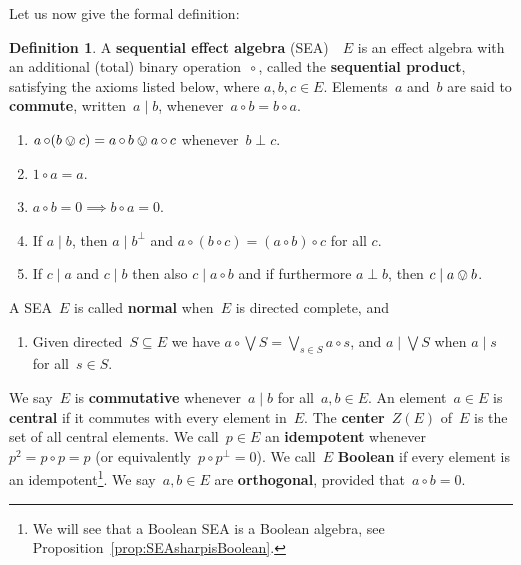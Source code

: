 \documentclass[a4paper, onecolumn, accepted=2020-12-22]{quantumarticle}
\newcommand\Define[1]{\textbf{#1}}
\newcommand{\mult}{\mathop{\circ}}
\newcommand{\commu}{\mathrel{\lvert}}
\newcounter{counter}
\theoremstyle{definition}
\newtheorem{definition}[counter]{Definition}
\begin{document}
Let us now give the formal definition:
\begin{definition}
  \label{defn:sea}
    A \Define{sequential effect algebra}
    (SEA)~\cite{gudder2002sequential}~$E$
    is an
     effect algebra with an additional (total)
    binary operation~$\mult$,
        called the \Define{sequential product},
        satisfying the axioms listed below,
        where $a,b,c\in E$.
        Elements~$a$ and~$b$ are said to \Define{commute},
            written~$a \commu b$,
            whenever~$a \mult b = b \mult a$.
    \begin{enumerate}
        \item[S1.]
            $a\mult (b\ovee c) = a\mult b \ovee a \mult c$
            whenever~$b\perp c$.
        \item[S2.]
            $1\mult a = a$.
        \item[S3.] 
            $a\mult b = 0 \implies b\mult a =0$.
        \item[S4.]
            If $a\commu b$, then $a\commu b^\perp$ and $a\mult
                (b\mult c) = (a\mult b)\mult c$ for all $c$.
        \item[S5.] 
                If $c\commu a$ and $c\commu b$ then also $c\commu
	    a\mult b$ and if furthermore $a\perp  b$, then $c\commu a\ovee
	    b$.
    \end{enumerate}
    A SEA~$E$ is called \Define{normal}
        when~$E$ is directed complete, and
    \begin{enumerate}[resume]
        \item[S6.]
            Given directed~$S\subseteq E$ we have
            $a\mult \bigvee S = \bigvee_{s\in S} a\mult s$,
            and $a\commu \bigvee S$ when $a\commu s$ for all~$s\in S$.
    \end{enumerate}
    We say~$E$ is \Define{commutative} whenever~$a \commu b$ for
        all~$a,b \in E$.
    An element~$a \in E$ is \Define{central}
        if it commutes with every element in~$E$.
        The \Define{center}~$Z(E)$ of~$E$ is the set of all central elements.
    We call~$p \in E$ an \Define{idempotent}
        whenever~$p^2=  p\mult p = p$
    (or equivalently~$p \mult p^\perp = 0$).
    We call~$E$ \Define{Boolean}
        if every element is an idempotent\footnote{
        We will see that a Boolean SEA is a Boolean algebra,
         see Proposition~\ref{prop:SEAsharpisBoolean}.}.
    We say~$a,b \in E$ are \Define{orthogonal},
        provided that~$a \mult b =0$.
\end{definition}
\end{document}

